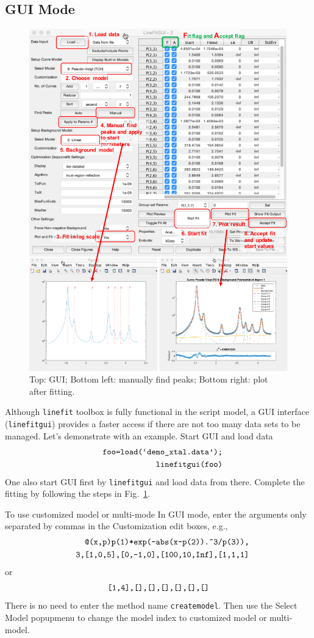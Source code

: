 \documentclass[reprint,showpacs,prb,nofootinbib,amsmath,amssymb]{revtex4-1}
\begin{document}
\subsection{GUI Mode}
\begin{figure}
	\centering
	\includegraphics[width=.8\linewidth]{fig}
	\caption{Top: GUI; Bottom left: manually find peaks; Bottom right: plot after fitting.}
	\label{fig:fig}
\end{figure}	

Although \verb|linefit| toolbox is fully functional in the script model, a GUI interface (\verb|linefitgui|) provides a faster access if there are not too many data sets to be managed. Let's demonstrate with an example. Start GUI and load data
\begin{eqnarray*}
	&&\verb|foo=load(`demo_xtal.data');| \\ 
	&&\verb|linefitgui(foo)|
\end{eqnarray*}
One also start GUI first by \verb|linefitgui| and load data from there. Complete the fitting by following the steps in Fig.~\ref{fig:fig}.

To use customized model or multi-mode In GUI mode, enter the arguments only separated by commas in the Customization edit boxes, e.g.,
\begin{eqnarray*}
	&&\verb|@(x,p)p(1)*exp(-abs(x-p(2)).^3/p(3)),| \\
	&&\verb|3,[1,0,5],[0,-1,0],[100,10,Inf],[1,1,1]|
\end{eqnarray*}
or
\begin{eqnarray*}
\verb|[1,4],[],[],[],[],[],[]|
\end{eqnarray*}
There is no need to enter the method name \verb|createmodel|. Then use the Select Model popupmenu to change the model index to customized model or multi-model.
\end{document}
